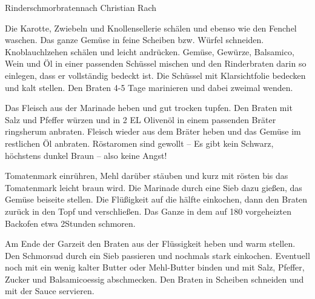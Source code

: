\begin{recipe}{Rinderschmorbraten}{nach Christian Rach}


  \steps
  Die Karotte, Zwiebeln und Knollensellerie schälen und ebenso wie den Fenchel waschen.
  Das ganze Gemüse in feine Scheiben bzw. Würfel schneiden. Knoblauchlzehen schälen und
  leicht andrücken. Gemüse, Gewürze, Balsamico, Wein und Öl in einer passenden Schüssel
  mischen und den Rinderbraten darin so einlegen, dass er vollständig bedeckt ist. Die
  Schüssel mit Klarsichtfolie bedecken und kalt stellen. Den Braten 4-5 Tage marinieren
  und dabei zweimal wenden.

  Das Fleisch aus der Marinade heben und gut trocken tupfen. Den Braten mit Salz und
  Pfeffer würzen und in 2 EL Olivenöl in einem passenden Bräter ringsherum anbraten.
  Fleisch wieder aus dem Bräter heben und das Gemüse im restlichen Öl anbraten.
  Röstaromen sind gewollt -- Es gibt kein Schwarz, höchstens dunkel Braun -- also
  keine Angst!

  Tomatenmark einrühren, Mehl darüber stäuben und kurz mit rösten bis das Tomatenmark
  leicht braun wird. Die Marinade durch eine Sieb dazu gießen, das Gemüse beiseite
  stellen. Die Flüßigkeit auf die hälfte einkochen, dann den Braten zurück in den Topf
  und verschließen. Das Ganze in dem auf 180 \celsius vorgeheizten Backofen etwa
  2\halb Stunden schmoren.

  Am Ende der Garzeit den Braten aus der Flüssigkeit heben und warm stellen. Den
  Schmorsud durch ein Sieb passieren und nochmals stark einkochen. Eventuell noch mit
  ein wenig kalter Butter oder Mehl-Butter binden und mit Salz, Pfeffer, Zucker und
  Balsamicoessig abschmecken. Den Braten in Scheiben schneiden und mit der Sauce
  servieren.
\end{recipe}
